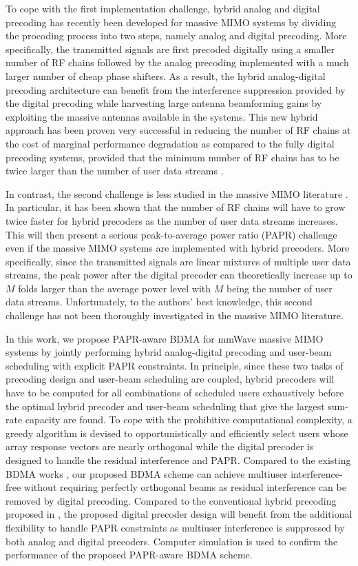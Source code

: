 \documentclass[conference]{IEEEtran}
\begin{document}
To cope with the first implementation challenge, hybrid analog and digital precoding has recently been developed for massive MIMO systems by dividing the procoding process into two steps, namely analog and digital precoding\cite{han2015large, el2014spatially}. More specifically, the transmitted signals are first precoded digitally using a smaller number of RF chains followed by the analog precoding implemented with a much larger number of cheap phase shifters. As a result, the hybrid analog-digital precoding architecture can benefit from the interference suppression provided by the digital precoding while harvesting large antenna beamforming gains by exploiting the massive antennas available in the systems\cite{alkhateeb2014channel}. This new hybrid approach has been proven very successful in reducing the number of RF chains at the cost of marginal performance degradation as compared to the fully digital precoding systems, provided that the minimum number of RF chains has to be twice larger than the number of user data streams \cite{haghighathybrid}.

In contrast, the second challenge is less studied in the massive MIMO literature \cite{mohammed2013per, Chen2017}. In particular, it has been shown that the number of RF chains will have to grow twice faster for hybrid precoders as the number of user data streams increases. This will then present a serious peak-to-average power ratio (PAPR) challenge even if the massive MIMO systems are implemented with hybrid precoders. More specifically, since the transmitted signals are linear mixtures of multiple user data streams, the peak power after the digital precoder can theoretically increase up to $M$ folds larger than the average power level with $M$ being the number of user data streams. Unfortunately, to the authors' best knowledge, this second challenge has not been thoroughly investigated in the massive MIMO literature.

In this work, we propose PAPR-aware BDMA for mmWave massive MIMO systems by jointly performing hybrid analog-digital precoding and user-beam scheduling with explicit PAPR constraints. In principle, since these two tasks of precoding design and user-beam scheduling are coupled, hybrid precoders will have to be computed for all combinations of scheduled users exhaustively before the optimal hybrid precoder and user-beam scheduling that give the largest sum-rate capacity are found. To cope with the prohibitive computational complexity, a greedy algorithm is devised to opportunistically and efficiently select users whose array response vectors are nearly orthogonal while the digital precoder is designed to handle the residual interference and PAPR. Compared to the existing BDMA works \cite{sun2015beam, Jiang2018}, our proposed BDMA scheme can achieve multiuser interference-free without requiring perfectly orthogonal beams as residual interference can be removed by digital precoding. Compared to the conventional hybrid precoding proposed in \cite{alkhateeb2014channel}, the proposed digital precoder design will benefit from the additional flexibility to handle PAPR constraints as multiuser interference is suppressed by both analog and digital precoders. Computer simulation is used to confirm the performance of the proposed PAPR-aware BDMA scheme.
\end{document}
